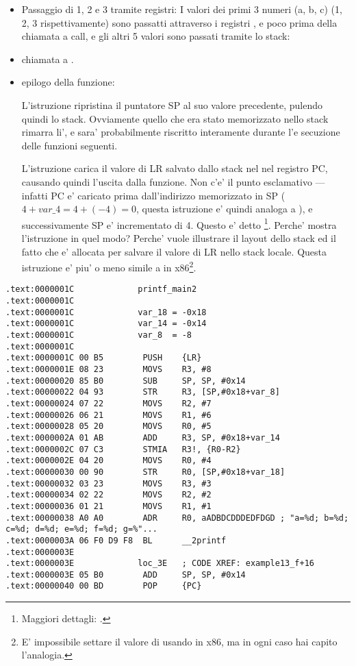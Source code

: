 \begin{itemize}
\item Passaggio di 1, 2 e 3 tramite registri:
I valori dei primi 3 numeri (a, b, c) (1, 2, 3 rispettivamente) sono passatti attraverso i registri
,  e 
poco prima della chiamata a \printf call, e gli altri 5 valori sono passati tramite lo stack:

\item chiamata a \printf.

\item epilogo della funzione:


L'istruzione  ripristina il puntatore \ac{SP} al suo valore precedente, pulendo quindi lo stack.
Ovviamente quello che era stato memorizzato nello stack rimarra li', e sara' probabilmente riscritto interamente durante l'e
secuzione delle funzioni seguenti.

L'istruzione  carica il valore di \ac{LR} salvato dallo stack nel nel registro \ac{PC}, causando quindi
l'uscita dalla funzione.
Non c'e' il punto esclamativo ---infatti \ac{PC} e' caricato prima dall'indirizzo memorizzato in \ac{SP} ($4+var\_4=4+(-4)=0$, questa istruzione e' quindi analoga a ), e successivamente \ac{SP} e' incrementato di 4.
Questo e' detto \footnote{Maggiori dettagli: .}.
Perche' \IDA mostra l'istruzione in quel modo?
Perche' vuole illustrare il layout dello stack ed il fatto che  e' allocata per salvare il valore di \ac{LR} nello stack locale.
Questa istruzione e' piu' o meno simile a  in x86\footnote{E' impossibile settare il valore di  usando \POP in x86, ma in ogni caso hai capito l'analogia.}.

\end{itemize}

\myparagraph{\OptimizingKeilVI: \ThumbMode}

\begin{lstlisting}[style=customasmARM]
.text:0000001C             printf_main2
.text:0000001C
.text:0000001C             var_18 = -0x18
.text:0000001C             var_14 = -0x14
.text:0000001C             var_8  = -8
.text:0000001C
.text:0000001C 00 B5        PUSH    {LR}
.text:0000001E 08 23        MOVS    R3, #8
.text:00000020 85 B0        SUB     SP, SP, #0x14
.text:00000022 04 93        STR     R3, [SP,#0x18+var_8]
.text:00000024 07 22        MOVS    R2, #7
.text:00000026 06 21        MOVS    R1, #6
.text:00000028 05 20        MOVS    R0, #5
.text:0000002A 01 AB        ADD     R3, SP, #0x18+var_14
.text:0000002C 07 C3        STMIA   R3!, {R0-R2}
.text:0000002E 04 20        MOVS    R0, #4
.text:00000030 00 90        STR     R0, [SP,#0x18+var_18]
.text:00000032 03 23        MOVS    R3, #3
.text:00000034 02 22        MOVS    R2, #2
.text:00000036 01 21        MOVS    R1, #1
.text:00000038 A0 A0        ADR     R0, aADBDCDDDEDFDGD ; "a=%d; b=%d; c=%d; d=%d; e=%d; f=%d; g=%"...
.text:0000003A 06 F0 D9 F8  BL      __2printf
.text:0000003E
.text:0000003E             loc_3E   ; CODE XREF: example13_f+16
.text:0000003E 05 B0        ADD     SP, SP, #0x14
.text:00000040 00 BD        POP     {PC}
\end{lstlisting}

